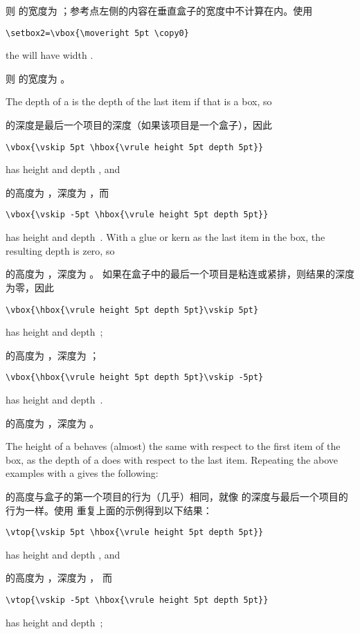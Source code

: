 则  的宽度为 \n{5pt}；参考点左侧的内容在垂直盒子的宽度中不计算在内。使用
\begin{verbatim}
\setbox2=\vbox{\moveright 5pt \copy0}
\end{verbatim}
the  will have width \n{15pt}.

则  的宽度为 \n{15pt}。

The depth of a  is the depth of the last item if
that is a box, so

 的深度是最后一个项目的深度（如果该项目是一个盒子），因此
\begin{verbatim}
\vbox{\vskip 5pt \hbox{\vrule height 5pt depth 5pt}}
\end{verbatim}
has height \n{10pt} and depth \n{5pt}, 
and 

的高度为 \n{10pt}，深度为 \n{5pt}，而
\begin{verbatim}
\vbox{\vskip -5pt \hbox{\vrule height 5pt depth 5pt}}
\end{verbatim}
has height \n{0pt} and depth~\n{5pt}.
With a glue or kern as the last item in the box, the resulting depth
is zero, so 

的高度为 \n{0pt}，深度为 \n{5pt}。
如果在盒子中的最后一个项目是粘连或紧排，则结果的深度为零，因此
\begin{verbatim}
\vbox{\hbox{\vrule height 5pt depth 5pt}\vskip 5pt}
\end{verbatim}
has height \n{15pt} and depth~\n{0pt};

的高度为 \n{15pt}，深度为 \n{0pt}；
\begin{verbatim}
\vbox{\hbox{\vrule height 5pt depth 5pt}\vskip -5pt}
\end{verbatim}
has height \n{5pt} and depth~\n{0pt}.

的高度为 \n{5pt}，深度为 \n{0pt}。

The height of a  behaves (almost) the same with respect to
the first item of the box, as the depth of a  does
with respect to the last item. Repeating the above examples with
a  gives the following:

 的高度与盒子的第一个项目的行为（几乎）相同，就像  的深度与最后一个项目的行为一样。使用  重复上面的示例得到以下结果：
\begin{verbatim}
\vtop{\vskip 5pt \hbox{\vrule height 5pt depth 5pt}}
\end{verbatim}
has height \n{0pt} and depth \n{15pt}, 
and 

的高度为 \n{0pt}，深度为 \n{15pt}，
而
\begin{verbatim}
\vtop{\vskip -5pt \hbox{\vrule height 5pt depth 5pt}}
\end{verbatim}
has height \n{0pt} and depth~\n{5pt};

